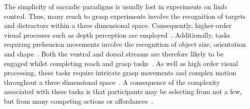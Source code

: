 \documentclass[10pt,letterpaper]{article}
\begin{document}
The simplicity of saccadic paradigms is usually lost in experiments on
limb control. Thus, many reach to grasp experiments involve the
recognition of targets and distractors within a three dimensional
space. Consequently, higher-order visual processes such as depth
perception are employed~\cite{welsh_movement_2004}. Additionally,
tasks requiring prehension movements involve the recognition of object
size, orientation and shape~\cite{meegan_visual_1999}. Both the
ventral and dorsal streams are therefore likely to be engaged whilst
completing reach and grasp tasks~\cite{milner_two_2008}. As well as
high order visual processing, these tasks require intricate grasp
movements and complex motion throughout a three dimensional
space~\cite{howard_hand_1997,tipper_selective_1997,
  tipper_actionbased_1998,castiello_mechanisms_1999,jackson_are_1995}. A
consequence of the complexity associated with these tasks is that
participants may be selecting from not a few, but from many competing
actions or affordances~\cite{cisek_cortical_2007}.
\end{document}
